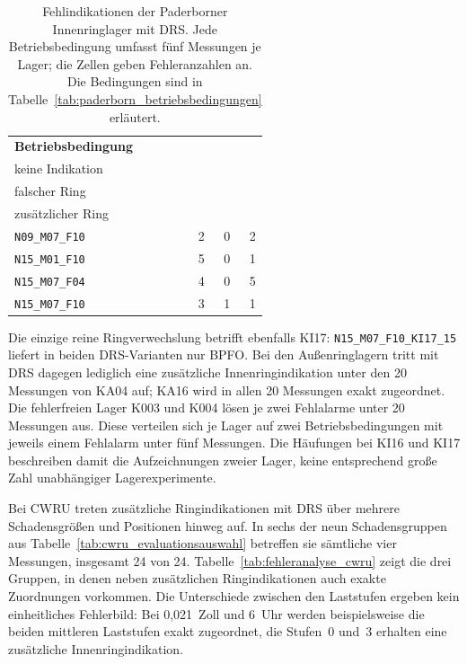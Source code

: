 \begin{table}[htbp]
  \centering
  \caption{Fehlindikationen der Paderborner Innenringlager mit DRS.
    Jede Betriebsbedingung umfasst fünf Messungen je Lager; die Zellen
    geben Fehleranzahlen an. Die Bedingungen sind in
    Tabelle~\ref{tab:paderborn_betriebsbedingungen} erläutert.}
  \label{tab:fehleranalyse_paderborn}
  \small
  \begin{tabular}{lrrr}
    \hline
    \textbf{Betriebsbedingung} &
      \shortstack{\textbf{KI17}\\keine Indikation} &
      \shortstack{\textbf{KI17}\\falscher Ring} &
      \shortstack{\textbf{KI16}\\zusätzlicher Ring} \\
    \hline
    \texttt{N09\_M07\_F10} & 2 & 0 & 2 \\
    \texttt{N15\_M01\_F10} & 5 & 0 & 1 \\
    \texttt{N15\_M07\_F04} & 4 & 0 & 5 \\
    \texttt{N15\_M07\_F10} & 3 & 1 & 1 \\
    \hline
  \end{tabular}
\end{table}

Die einzige reine Ringverwechslung betrifft ebenfalls KI17:
\texttt{N15\_M07\_F10\_KI17\_15} liefert in beiden DRS-Varianten nur BPFO.
Bei den Außenringlagern tritt mit DRS dagegen lediglich eine zusätzliche
Innenringindikation unter den 20 Messungen von KA04 auf; KA16 wird in allen
20 Messungen exakt zugeordnet. Die fehlerfreien Lager K003 und K004 lösen
je zwei Fehlalarme unter 20 Messungen aus. Diese verteilen sich je Lager
auf zwei Betriebsbedingungen mit jeweils einem Fehlalarm unter fünf
Messungen. Die Häufungen bei KI16 und KI17 beschreiben damit die
Aufzeichnungen zweier Lager, keine entsprechend große Zahl unabhängiger
Lagerexperimente.

Bei CWRU treten zusätzliche Ringindikationen mit DRS über mehrere
Schadensgrößen und Positionen hinweg auf. In sechs der neun Schadensgruppen aus
Tabelle~\ref{tab:cwru_evaluationsauswahl} betreffen sie sämtliche vier
Messungen, insgesamt 24 von 24.
Tabelle~\ref{tab:fehleranalyse_cwru} zeigt die drei Gruppen, in denen neben
zusätzlichen Ringindikationen auch exakte Zuordnungen vorkommen.
Die Unterschiede zwischen den Laststufen ergeben kein einheitliches
Fehlerbild: Bei 0,021~Zoll und 6~Uhr werden beispielsweise die beiden
mittleren Laststufen exakt zugeordnet, die Stufen~0 und~3 erhalten eine
zusätzliche Innenringindikation.

